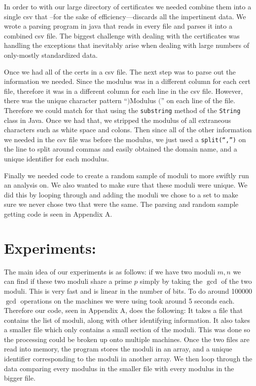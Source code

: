 \documentclass[11pt,twoside]{article}
\newcommand{\ty}[1]{\texttt{#1}}
\begin{document}
\begin{multicols}{2}
In order to with our large directory of certificates we needed combine them into
a single csv that –for the sake of efficiency—discards all the impertinent data.
We wrote a parsing program in java that reads in every file and parses it into a
combined csv file. The biggest challenge with dealing with the certificates was
handling the exceptions that inevitably arise when dealing with large numbers of
only-mostly standardized data. 

Once we had all of the certs in a csv file. The next step was to parse out the
information we needed. Since the modulus was in a different column for each cert
file, therefore it was in a different column for each line in the csv file.
However, there was the unique character pattern ``$)$Modulus $($'' on each line
of the file. Therefore we could match for that using the \ty{substring} method 
of the \ty{String} class in Java. Once we had that, we stripped the modulus of 
all extraneous characters such as white space and colons. Then since all of the
other information we needed in the csv file was before the modulus, we just used
a \ty{split(``,'')} on the line to split around commas and easily obtained the
domain name, and a unique identifier for each modulus.

Finally we needed code to create a random sample of moduli to more swiftly run
an analysis on. We also wanted to make sure that these moduli were unique. We
did this by looping through and adding the moduli we chose to a set to make sure
we never chose two that were the same. The parsing and random sample getting
code is seen in Appendix A.


\section{Experiments:}
The main idea of our experiments is as follows: if we have two moduli $m, n$ we
can find if these two moduli share a prime $p$ simply by taking the $\gcd$ of
the two moduli. This is very fast and is linear in the number of bits. To do
around 100000 $\gcd$ operations on the machines we were using took around 5
seconds each. Therefore our code, seen in Appendix A, does the following: It
takes a file that contains the list of moduli, along with other identifying 
information. It also takes a smaller file which only contains a small section of
the moduli. This was done so the processing could be broken up onto multiple
machines. Once the two files are read into memory, the program stores the moduli
in an array, and a unique identifier corresponding to the moduli in another
array. We then loop through the data comparing every modulus in the smaller file
with every modulus in the bigger file.


\end{multicols}
\end{document}
